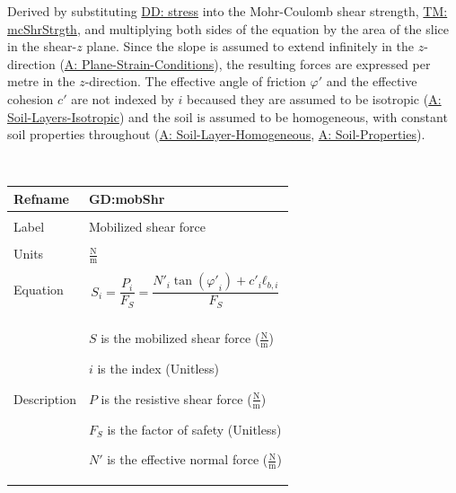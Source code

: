 \documentclass[12pt]{article}
\begin{document}
Derived by substituting \hyperref[DD:stress]{DD: stress} into the Mohr-Coulomb shear strength, \hyperref[TM:mcShrStrgth]{TM: mcShrStrgth}, and multiplying both sides of the equation by the area of the slice in the shear-$z$ plane. Since the slope is assumed to extend infinitely in the $z$-direction (\hyperref[assumpPSC]{A: Plane-Strain-Conditions}), the resulting forces are expressed per metre in the $z$-direction. The effective angle of friction $φ'$ and the effective cohesion $c'$ are not indexed by $i$ becaused they are assumed to be isotropic (\hyperref[assumpSLI]{A: Soil-Layers-Isotropic}) and the soil is assumed to be homogeneous, with constant soil properties throughout (\hyperref[assumpSLH]{A: Soil-Layer-Homogeneous}, \hyperref[assumpSP]{A: Soil-Properties}).
\par~

\noindent \begin{minipage}{\textwidth}
\begin{tabular}{p{} p{}}
\toprule \textbf{Refname} & \textbf{GD:mobShr}
\label{GD:mobShr}
\\ \midrule \\
Label & Mobilized shear force
        \\ \midrule \\
        Units & $\frac{\text{N}}{\text{m}}$
                \\ \midrule \\
                Equation & \begin{displaymath}
                           S_{i}=\frac{P_{i}}{{F_{S}}}=\frac{{N'}_{i} \tan\left({φ'}_{i}\right)+{c'}_{i} {ℓ_{b,i}}}{{F_{S}}}
                           \end{displaymath}
                           \\ \midrule \\
                           Description & \begin{symbDescription}
                                         \item{$S$ is the mobilized shear force ($\frac{\text{N}}{\text{m}}$)}
                                         \item{$i$ is the index (Unitless)}
                                         \item{$P$ is the resistive shear force ($\frac{\text{N}}{\text{m}}$)}
                                         \item{${F_{S}}$ is the factor of safety (Unitless)}
                                         \item{$N'$ is the effective normal force ($\frac{\text{N}}{\text{m}}$)}

\end{symbDescription}
\end{tabular}
\end{minipage}
\end{document}
